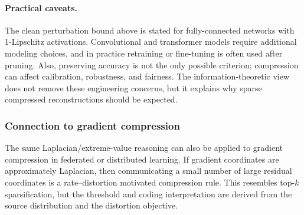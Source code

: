 \paragraph{Practical caveats.}
The clean perturbation bound above is stated for fully-connected networks with 1-Lipschitz activations.
Convolutional and transformer models require additional modeling choices, and in practice retraining or fine-tuning is often used after pruning.
Also, preserving accuracy is not the only possible criterion; compression can affect calibration, robustness, and fairness.
The information-theoretic view does not remove these engineering concerns, but it explains why sparse compressed reconstructions should be expected.

\subsubsection*{Connection to gradient compression}

The same Laplacian/extreme-value reasoning can also be applied to gradient compression in federated or distributed learning.
If gradient coordinates are approximately Laplacian, then communicating a small number of large residual coordinates is a rate--distortion motivated compression rule.
This resembles top-$k$ sparsification, but the threshold and coding interpretation are derived from the source distribution and the distortion objective.

